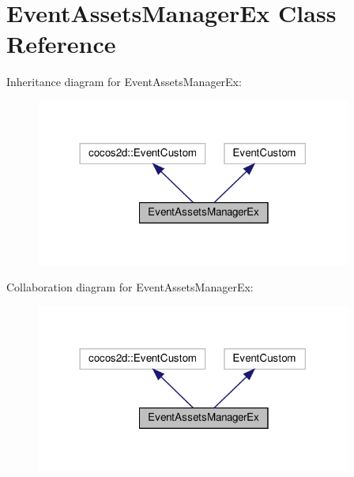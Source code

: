 \hypertarget{classEventAssetsManagerEx}{}\section{Event\+Assets\+Manager\+Ex Class Reference}
\label{classEventAssetsManagerEx}


Inheritance diagram for Event\+Assets\+Manager\+Ex\+:
\nopagebreak
\begin{figure}[H]
\begin{center}
\leavevmode
\includegraphics[width=294pt]{classEventAssetsManagerEx__inherit__graph}
\end{center}
\end{figure}


Collaboration diagram for Event\+Assets\+Manager\+Ex\+:
\nopagebreak
\begin{figure}[H]
\begin{center}
\leavevmode
\includegraphics[width=294pt]{classEventAssetsManagerEx__coll__graph}
\end{center}
\end{figure}
